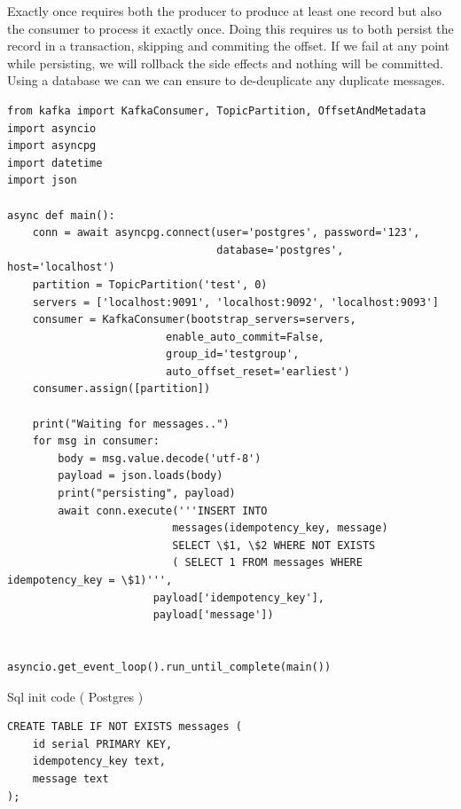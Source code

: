 \documentclass[11pt]{article}
\begin{document}
Exactly once requires both the producer to produce at least one record but also the consumer to process it exactly once.  Doing this requires us to both persist the record in a transaction, skipping and commiting the offset. If we fail at any point while persisting, we will rollback the side effects and nothing will be committed. Using a database we can we can ensure to de-deuplicate any duplicate messages.
\newline
\begin{adjustwidth}{-30pt}{0pt}
\begin{Verbatim}
from kafka import KafkaConsumer, TopicPartition, OffsetAndMetadata
import asyncio
import asyncpg
import datetime
import json

async def main():
    conn = await asyncpg.connect(user='postgres', password='123',
                                 database='postgres', host='localhost')
    partition = TopicPartition('test', 0)
    servers = ['localhost:9091', 'localhost:9092', 'localhost:9093']
    consumer = KafkaConsumer(bootstrap_servers=servers,
                         enable_auto_commit=False,
                         group_id='testgroup',
                         auto_offset_reset='earliest')
    consumer.assign([partition])

    print("Waiting for messages..")
    for msg in consumer:
        body = msg.value.decode('utf-8')
        payload = json.loads(body)
        print("persisting", payload)
        await conn.execute('''INSERT INTO 
        				  messages(idempotency_key, message)
                          SELECT \$1, \$2 WHERE NOT EXISTS
                          ( SELECT 1 FROM messages WHERE idempotency_key = \$1)''',
                       payload['idempotency_key'],
                       payload['message'])


asyncio.get_event_loop().run_until_complete(main())
\end{Verbatim}
\end{adjustwidth}


\clearpage
Sql init code ( Postgres )
\begin{adjustwidth}{-30pt}{0pt}
\begin{Verbatim}[frame=single]
CREATE TABLE IF NOT EXISTS messages (
    id serial PRIMARY KEY,
    idempotency_key text,
    message text
);
\end{Verbatim}
\end{adjustwidth}
\end{document}
